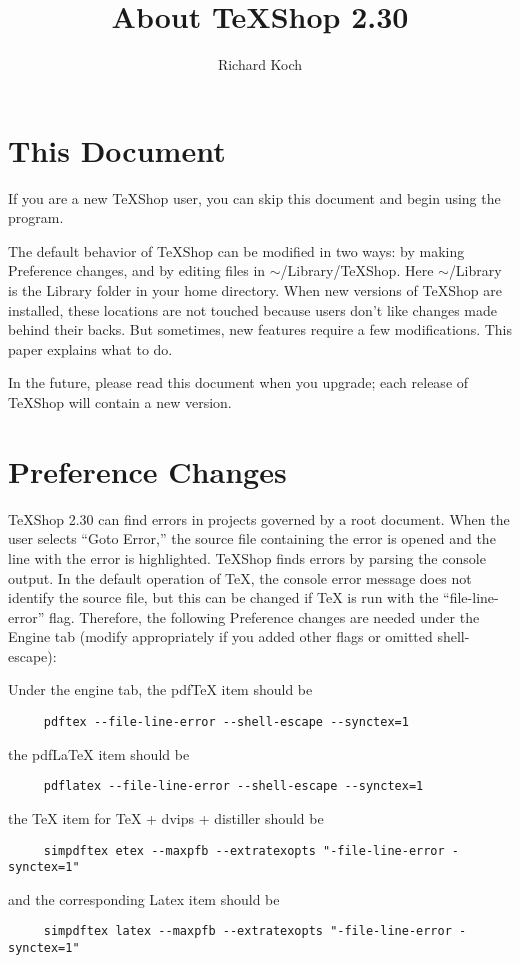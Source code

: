 \documentclass[11pt, oneside]{amsart}
\title{About TeXShop 2.30 }
\author{Richard Koch}
\begin{document}
\maketitle

\thispagestyle{empty}
\section{This Document}

If you are a new TeXShop user, you can skip this document and begin using the program.

The default behavior of TeXShop can be modified in two ways: by making Preference changes, and by editing files in $\sim$/Library/TeXShop. Here $\sim$/Library is the Library folder in your home directory. When new versions of TeXShop are installed, these locations are not touched because users don't like changes made behind their backs. But sometimes, new features require a few modifications. This paper explains what to do. 

In the future, please read this document when you upgrade; each release of TeXShop will contain a new version.
\section{Preference Changes}

TeXShop 2.30 can find errors in projects governed by a root document. When the user selects ``Goto Error,'' the source file containing the error is opened and the line with the error is highlighted. TeXShop finds errors by parsing the console output. In the default operation of TeX, the console error message does not identify the source file, but this can be changed if TeX is run with the ``file-line-error'' flag. Therefore, the following Preference changes are needed under the Engine tab (modify appropriately if you added other flags or omitted shell-escape):

Under the engine tab, the pdfTeX item should be
\begin{verbatim}
     pdftex --file-line-error --shell-escape --synctex=1
\end{verbatim}
the pdfLaTeX item should be
\begin{verbatim}
     pdflatex --file-line-error --shell-escape --synctex=1 
\end{verbatim}
the TeX item for TeX + dvips + distiller should be
\begin{verbatim}
     simpdftex etex --maxpfb --extratexopts "-file-line-error -synctex=1"
\end{verbatim}
and the corresponding Latex item should be
\begin{verbatim}
     simpdftex latex --maxpfb --extratexopts "-file-line-error -synctex=1"
\end{verbatim}
\end{document}
